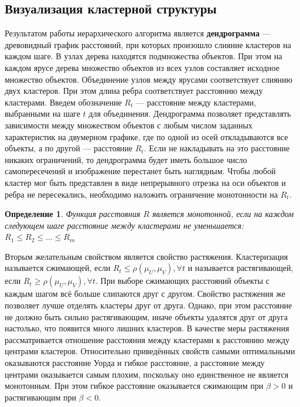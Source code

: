 \documentclass[10pt]{article}
\renewcommand{\leq}{\leqslant}
\renewcommand{\geq}{\geqslant}
\newtheorem{definition}{Определение}
\begin{document}
\subsection{Визуализация кластерной структуры}
Результатом работы иерархического алгоритма является \textbf{дендрограмма} 
--- древовидный график расстояний, при которых произошло слияние кластеров на каждом шаге.
В узлах дерева находятся подмножества объектов. При этом на каждом ярусе дерева множество объектов из всех узлов составляет исходное множество объектов. Объединение узлов между ярусами соответствует слиянию двух кластеров. При этом длина ребра соответствует расстоянию между кластерами. Введем обозначение $R_t$ --- расстояние между кластерами, выбранными на шаге $t$ для объединения. Дендрограмма позволяет представлять зависимости между множеством объектов с любым числом заданных характеристик на двумерном графике, где по одной из осей откладываются все объекты, а по другой --- расстояние $R_t$. Если не накладывать на это расстояние никаких ограничений, то дендрограмма будет иметь большое число самопересечений и изображение перестанет быть наглядным. Чтобы любой кластер мог быть представлен в виде непрерывного отрезка на оси объектов и ребра не пересекались, необходимо наложить ограничение монотонности на $R_t$.

\begin{definition}
	Функция расстояния $R$ является монотонной, если на каждом следующем шаге расстояние между кластерами не уменьшается: $R_1 \leq R_2 \leq \dots \leq R_m$
\end{definition}

Вторым желательным свойством является свойство растяжения. Кластеризация называется сжимающей, если $R_t \leq \rho(\mu_U, \mu_V), \forall t$ и называется растягивающей, 
если $R_t \geq \rho(\mu_U, \mu_V), \forall t$.
При выборе сжимающих расстояний объекты с каждым шагом всё больше слипаются друг с другом.
Свойство растяжения же позволяет лучше отделять кластеры друг от друга. 
Однако, при этом расстояние не должно быть сильно растягивающим, иначе объекты удалятся друг от друга настолько, что появится много лишних кластеров. 
В качестве меры растяжения рассматривается отношение расстояния между кластерами к расстоянию между центрами кластеров. 
Относительно приведённых свойств самыми оптимальными оказываются расстояние Уорда и гибкое расстояние, 
а расстояние между центрами оказывается самым плохим, поскольку оно единственное не является монотонным. 
При этом гибкое расстояние оказывается сжимающим при $\beta >0$ и растягивающим при $\beta <0$. 
\end{document}
